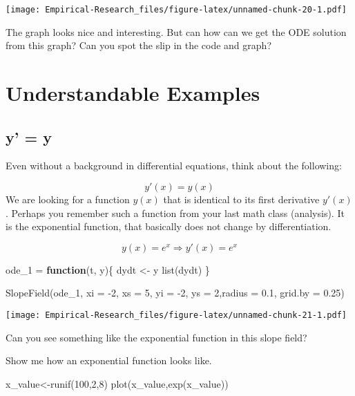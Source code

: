 \documentclass[
]{book}
\newenvironment{Shaded}{\begin{snugshade}}{\end{snugshade}}
\newcommand{\AttributeTok}[1]{\textcolor[rgb]{0.77,0.63,0.00}{#1}}
\newcommand{\ControlFlowTok}[1]{\textcolor[rgb]{0.13,0.29,0.53}{\textbf{#1}}}
\newcommand{\DecValTok}[1]{\textcolor[rgb]{0.00,0.00,0.81}{#1}}
\newcommand{\FloatTok}[1]{\textcolor[rgb]{0.00,0.00,0.81}{#1}}
\newcommand{\FunctionTok}[1]{\textcolor[rgb]{0.00,0.00,0.00}{#1}}
\newcommand{\NormalTok}[1]{#1}
\newcommand{\OtherTok}[1]{\textcolor[rgb]{0.56,0.35,0.01}{#1}}
\newcommand{\SpecialCharTok}[1]{\textcolor[rgb]{0.00,0.00,0.00}{#1}}
\begin{document}
\texttt{[image: Empirical-Research\_files/figure-latex/unnamed-chunk-20-1.pdf]}

The graph looks nice and interesting. But can how can we get the ODE solution from this graph? Can you spot the slip in the code and graph?

\hypertarget{understandable-examples}{%
\section{Understandable Examples}\label{understandable-examples}}

\hypertarget{y-y}{%
\subsection{y' = y}\label{y-y}}

Even without a background in differential equations, think about the following:

\[y'(x) = y(x)\]
We are looking for a function \(y(x)\) that is identical to its first derivative \(y'(x)\). Perhaps you remember such a function from your last math class (analysis). It is the exponential function, that basically does not change by differentiation.

\[y(x) = e^x \Rightarrow y'(x) = e^x \]

\begin{Shaded}
\begin{Highlighting}[]
\NormalTok{ode\_1 }\OtherTok{=} \ControlFlowTok{function}\NormalTok{(t, y)\{}
\NormalTok{  dydt }\OtherTok{\textless{}{-}}\NormalTok{ y}
  \FunctionTok{list}\NormalTok{(dydt)}
\NormalTok{\}}

\FunctionTok{SlopeField}\NormalTok{(ode\_1, }\AttributeTok{xi =} \SpecialCharTok{{-}}\DecValTok{2}\NormalTok{, }\AttributeTok{xs =} \DecValTok{5}\NormalTok{, }\AttributeTok{yi =} \SpecialCharTok{{-}}\DecValTok{2}\NormalTok{, }\AttributeTok{ys =} \DecValTok{2}\NormalTok{,}\AttributeTok{radius =} \FloatTok{0.1}\NormalTok{, }\AttributeTok{grid.by =} \FloatTok{0.25}\NormalTok{)}
\end{Highlighting}
\end{Shaded}

\texttt{[image: Empirical-Research\_files/figure-latex/unnamed-chunk-21-1.pdf]}

Can you see something like the exponential function in this slope field?

Show me how an exponential function looks like.

\begin{Shaded}
\begin{Highlighting}[]
\NormalTok{x\_value}\OtherTok{\textless{}{-}}\FunctionTok{runif}\NormalTok{(}\DecValTok{100}\NormalTok{,}\DecValTok{2}\NormalTok{,}\DecValTok{8}\NormalTok{)}
\FunctionTok{plot}\NormalTok{(x\_value,}\FunctionTok{exp}\NormalTok{(x\_value))}
\end{Highlighting}
\end{Shaded}
\end{document}
